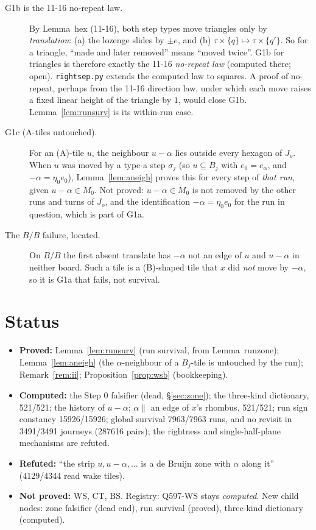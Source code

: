 \documentclass[11pt]{article}
\theoremstyle{definition}\newtheorem{definition}[theorem]{Definition}\newtheorem{remark}[theorem]{Remark}
\begin{document}
\begin{description}
\item[G1b is the 11-16 no-repeat law.] By Lemma~hex (11-16), both step types move triangles only by \emph{translation}: (a) the lozenge slides by $\pm e$, and (b) $\tau\times\{q\}\mapsto\tau\times\{q'\}$. So for a triangle, ``made and later removed'' means ``moved twice''.
G1b for triangles is therefore exactly the 11-16 \emph{no-repeat law} (computed there; open). \texttt{rightsep.py} extends the computed law to squares. A proof of no-repeat, perhaps from the 11-16 direction law, under which each move raises a fixed linear height of the triangle by $1$, would close G1b. Lemma~\ref{lem:runsurv} is its within-run case.
\item[G1c (A-tiles untouched).] For an (A)-tile $u$, the neighbour $u-\alpha$ lies outside every hexagon of $J_o$. When $u$ was moved by a type-a step $\sigma_j$ (so $u\subseteq B_j$ with $e_0=e_\alpha$, and $-\alpha=\eta_0e_0$), Lemma~\ref{lem:aneigh} proves this for every step of \emph{that run}, given $u-\alpha\in M_0$.
Not proved: $u-\alpha\in M_0$ is not removed by the other runs and turns of $J_o$, and the identification $-\alpha=\eta_0e_0$ for the run in question, which is part of G1a.
\item[The $B/B$ failure, located.] On $B/B$ the first absent translate has $-\alpha$ not an edge of $u$ and $u-\alpha$ in neither board. Such a tile is a (B)-shaped tile that $x$ did \emph{not} move by $-\alpha$, so it is G1a that fails, not survival.
\end{description}

\section{Status}
\begin{itemize}
\item \textbf{Proved:} Lemma~\ref{lem:runsurv} (run survival, from Lemma~runzone); Lemma~\ref{lem:aneigh} (the $\alpha$-neighbour of a $B_j$-tile is untouched by the run); Remark~\ref{rem:ii}; Proposition~\ref{prop:wsb} (bookkeeping).
\item \textbf{Computed:} the Step 0 falsifier (dead, \S\ref{sec:zone}); the three-kind dictionary, 521/521; the history of $u-\alpha$; $\alpha\parallel$ an edge of $x$'s rhombus, 521/521; run sign constancy 15926/15926; global survival 7963/7963 runs, and no revisit in 3491/3491 journeys (287616 pairs); the rightness and single-half-plane mechanisms are refuted.
\item \textbf{Refuted:} ``the strip $u,u-\alpha,\dots$ is a de Bruijn zone with $\alpha$ along it'' (4129/4344 read wake tiles).
\item \textbf{Not proved:} WS, CT, BS. Registry: Q597-WS stays \emph{computed}. New child nodes: zone falsifier (dead end), run survival (proved), three-kind dictionary (computed).
\end{itemize}
\end{document}
